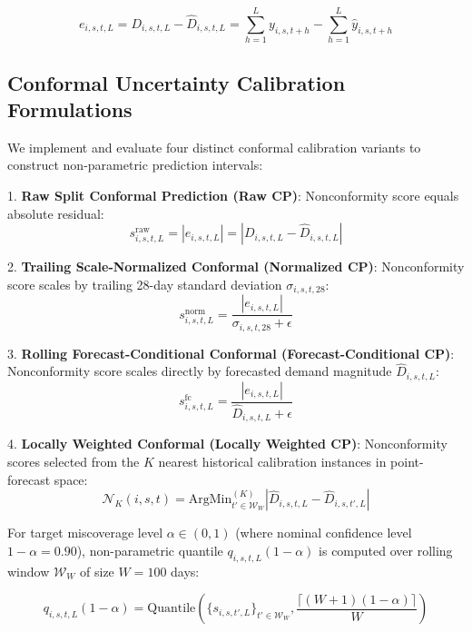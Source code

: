 \begin{equation}
e_{i,s,t,L} = D_{i,s,t,L} - \hat{D}_{i,s,t,L} = \sum_{h=1}^L y_{i,s,t+h} - \sum_{h=1}^L \hat{y}_{i,s,t+h}
\end{equation}

\subsection{Conformal Uncertainty Calibration Formulations}
We implement and evaluate four distinct conformal calibration variants to construct non-parametric prediction intervals:

1. \textbf{Raw Split Conformal Prediction (Raw CP)}: Nonconformity score equals absolute residual:
\begin{equation}
s_{i,s,t,L}^{\text{raw}} = |e_{i,s,t,L}| = |D_{i,s,t,L} - \hat{D}_{i,s,t,L}|
\end{equation}

2. \textbf{Trailing Scale-Normalized Conformal (Normalized CP)}: Nonconformity score scales by trailing 28-day standard deviation $\sigma_{i,s,t,28}$:
\begin{equation}
s_{i,s,t,L}^{\text{norm}} = \frac{|e_{i,s,t,L}|}{\sigma_{i,s,t,28} + \epsilon}
\end{equation}

3. \textbf{Rolling Forecast-Conditional Conformal (Forecast-Conditional CP)}: Nonconformity score scales directly by forecasted demand magnitude $\hat{D}_{i,s,t,L}$:
\begin{equation}
s_{i,s,t,L}^{\text{fc}} = \frac{|e_{i,s,t,L}|}{\hat{D}_{i,s,t,L} + \epsilon}
\end{equation}

4. \textbf{Locally Weighted Conformal (Locally Weighted CP)}: Nonconformity scores selected from the $K$ nearest historical calibration instances in point-forecast space:
\begin{equation}
\mathcal{N}_K(i,s,t) = \text{ArgMin}_{t' \in \mathcal{W}_W}^{(K)} |\hat{D}_{i,s,t,L} - \hat{D}_{i,s,t',L}|
\end{equation}

For target miscoverage level $\alpha \in (0, 1)$ (where nominal confidence level $1-\alpha = 0.90$), non-parametric quantile $q_{i,s,t,L}(1-\alpha)$ is computed over rolling window $\mathcal{W}_W$ of size $W=100$ days:

\begin{equation}
q_{i,s,t,L}(1-\alpha) = \text{Quantile} \left( \{ s_{i,s,t',L} \}_{t' \in \mathcal{W}_W}, \frac{\lceil (W+1)(1-\alpha) \rceil}{W} \right)
\end{equation}

